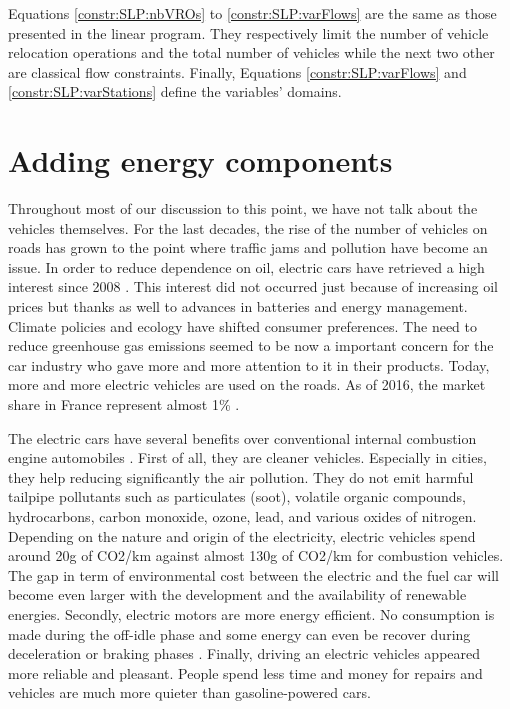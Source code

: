 \begin{bibunit}[ieeetr]
\medskip
Equations \eqref{constr:SLP:nbVROs} to \eqref{constr:SLP:varFlows} are the same as those presented in the {\SDP} linear program.
They respectively limit the number of vehicle relocation operations and the total number of vehicles while the next two other are classical flow constraints.
Finally, Equations \eqref{constr:SLP:varFlows} and \eqref{constr:SLP:varStations} define the variables' domains.


\newpage
\section{Adding energy components}
Throughout most of our discussion to this point, we have not talk about the vehicles themselves.
For the last decades, the rise of the number of vehicles on roads has grown to the point where traffic jams and pollution have become an issue.
In order to reduce dependence on oil, electric cars have retrieved a high interest since 2008 \cite{sperling_two_2009}.
This interest did not occurred just because of increasing oil prices but thanks as well to advances in batteries and energy management.
Climate policies and ecology have shifted consumer preferences.
The need to reduce greenhouse gas emissions seemed to be now a important concern for the car industry who  gave more and more attention to it in their products.
Today, more and more electric vehicles are used on the roads.
As of 2016, the market share in France represent almost 1\% \cite{VE_MarketShare2016}.

\medskip
The electric cars have several benefits over conventional internal combustion engine automobiles \cite{VE_avantages}.
First of all, they are cleaner vehicles.
Especially in cities, they help reducing significantly the air pollution.
They do not emit harmful tailpipe pollutants such as particulates (soot), volatile organic compounds, hydrocarbons, carbon monoxide, ozone, lead, and various oxides of nitrogen.
Depending on the nature and origin of the electricity, electric vehicles spend around 20g of CO2/km against almost 130g of CO2/km for combustion vehicles.
The gap in term of environmental cost between the electric and the fuel car will become even larger with the development and the availability of renewable energies.
Secondly, electric motors are more energy efficient.
No consumption is made during the off-idle phase and some energy can even be recover during deceleration or braking phases \cite{artmeier_optimal_2010}.
Finally, driving an electric vehicles appeared more reliable and pleasant.
People spend less time and money for repairs and vehicles are much more quieter than gasoline-powered cars.


\end{bibunit}
